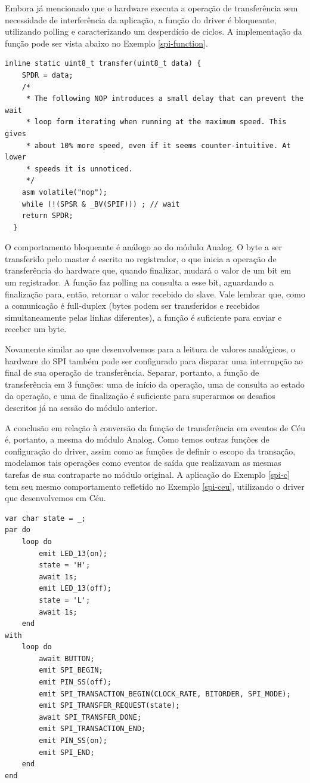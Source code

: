 \documentclass[11pt]{article}
\begin{document}
\par Embora já mencionado que o hardware executa a operação de transferência sem necessidade de interferência da aplicação, a função do driver é bloqueante, utilizando polling e caracterizando um desperdício de ciclos. A implementação da função pode ser vista abaixo no Exemplo \ref{spi-function}. 
\begin{lstlisting}[style=CStyle,label=spi-function,caption=Implementação bloqueante da função de transferência SPI]
  inline static uint8_t transfer(uint8_t data) {
    SPDR = data;
    /*
     * The following NOP introduces a small delay that can prevent the wait
     * loop form iterating when running at the maximum speed. This gives
     * about 10% more speed, even if it seems counter-intuitive. At lower
     * speeds it is unnoticed.
     */
    asm volatile("nop");
    while (!(SPSR & _BV(SPIF))) ; // wait
    return SPDR;
  }
\end{lstlisting}
\par O comportamento bloqueante é análogo ao do módulo Analog. O byte a ser transferido pelo master é escrito no registrador, o que inicia a operação de transferência do hardware que, quando finalizar, mudará o valor de um bit em um registrador. A função faz polling na consulta a esse bit, aguardando a finalização para, então, retornar o valor recebido do slave. Vale lembrar que, como a comunicação é full-duplex (bytes podem ser transferidos e recebidos simultaneamente pelas linhas diferentes), a função é suficiente para enviar e receber um byte.
\par Novamente similar ao que desenvolvemos para a leitura de valores analógicos, o hardware do SPI também pode ser configurado para disparar uma interrupção ao final de sua operação de transferência. Separar, portanto, a função de transferência em 3 funções: uma de início da operação, uma de consulta ao estado da operação, e uma de finalização é suficiente para superarmos os desafios descritos já na sessão do módulo anterior. 
\par A conclusão em relação à conversão da função de transferência em eventos de Céu é, portanto, a mesma do módulo Analog. Como temos outras funções de configuração do driver, assim como as funções de definir o escopo da transação, modelamos tais operações como eventos de saída que realizavam as mesmas tarefas de sua contraparte no módulo original. A aplicação do Exemplo \ref{spi-c} tem seu mesmo comportamento refletido no Exemplo \ref{spi-ceu}, utilizando o driver que desenvolvemos em Céu.
\begin{lstlisting}[style=CStyle,label=spi-ceu,caption=Aplicação utilizando driver SPI em Céu]
var char state = _;
par do
    loop do
        emit LED_13(on);
        state = 'H';
        await 1s;
        emit LED_13(off);
        state = 'L';
        await 1s;
    end
with
    loop do
        await BUTTON;
        emit SPI_BEGIN;
        emit PIN_SS(off);
        emit SPI_TRANSACTION_BEGIN(CLOCK_RATE, BITORDER, SPI_MODE);
        emit SPI_TRANSFER_REQUEST(state);
        await SPI_TRANSFER_DONE;
        emit SPI_TRANSACTION_END;
        emit PIN_SS(on);
        emit SPI_END;
    end
end
\end{lstlisting}
\end{document}
